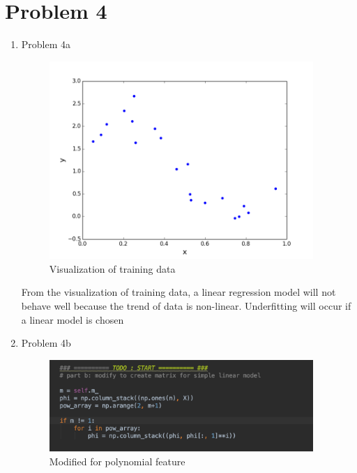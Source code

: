 \documentclass[11pt]{article}
\newcommand{\solution}[1]{{{\color{black}{\bf Solution:} {#1}}}}
\begin{document}
\newpage

\section{Problem 4}
\begin{enumerate}

	\item Problem 4a \newline
	
	\solution{
	
	\begin{figure}[h!]
	\centering
	\includegraphics[width = 10cm]{4a}
	\caption{Visualization of training data}
	\end{figure}
	
	From the visualization of training data, a linear regression model will not behave well because
	the trend of data is non-linear. Underfitting will occur if a linear model is chosen 
	
	}
	\vspace{2cm}
	
	\item Problem 4b \newline
	
	\solution{
	
	\begin{figure}[h!]
	\centering
	\includegraphics[width = 10cm]{4b}
	\caption{Modified for polynomial feature}
	\end{figure}

}
\end{enumerate}
\end{document}
